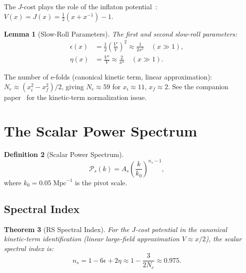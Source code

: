 \documentclass[12pt,a4paper]{article}
\newtheorem{theorem}{Theorem}[section]
\newtheorem{lemma}[theorem]{Lemma}
\theoremstyle{definition}
\newtheorem{definition}[theorem]{Definition}
\theoremstyle{remark}
\begin{document}
The $J$-cost plays the role of the inflaton
potential~\cite{RSInflation}:
$V(x) = J(x) = \tfrac{1}{2}(x + x^{-1}) - 1$.

\begin{lemma}[Slow-Roll Parameters]
\label{lem:slowroll}
The first and second slow-roll parameters:
\begin{align}
  \epsilon(x) &= \frac{1}{2}
  \left(\frac{V'}{V}\right)^2
  \approx \frac{1}{2x^2} \quad (x \gg 1),
  \label{eq:epsilon} \\
  \eta(x) &= \frac{V''}{V}
  \approx \frac{2}{x^4} \quad (x \gg 1).
  \label{eq:eta}
\end{align}
\end{lemma}

The number of e-folds (canonical kinetic term, linear approximation):
$N_e \approx (x_i^2 - x_f^2)/2$, giving $N_e \approx 59$ for
$x_i \approx 11$, $x_f \approx 2$.  See the companion
paper~\cite{RSInflation} for the kinetic-term normalization issue.

\section{The Scalar Power Spectrum}
\label{sec:scalar}

\begin{definition}[Scalar Power Spectrum]
\label{def:power}
\begin{equation}
  \mathcal{P}_s(k) = A_s
  \left(\frac{k}{k_0}\right)^{n_s - 1},
  \label{eq:Ps}
\end{equation}
where $k_0 = 0.05\;\mathrm{Mpc}^{-1}$ is the pivot scale.
\end{definition}

\subsection{Spectral Index}

\begin{theorem}[RS Spectral Index]
\label{thm:ns}
For the $J$-cost potential in the canonical kinetic-term
identification (linear large-field approximation $V \approx x/2$),
the scalar spectral index is:
\begin{equation}
  \boxed{n_s = 1 - 6\epsilon + 2\eta
  \approx 1 - \frac{3}{2N_e} \approx 0.975.}
  \label{eq:ns}
\end{equation}
\end{theorem}
\end{document}
